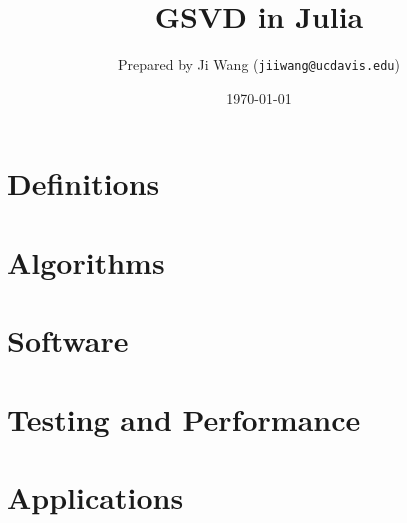 \documentclass{article}
\title{GSVD in Julia}
\author{
Prepared by Ji Wang ({\tt jiiwang@ucdavis.edu})
}
\date{\today}
\numberwithin{equation}{section}
\begin{document}
\maketitle

\tableofcontents

\newpage
\section{Definitions}

\newpage

\section{Algorithms}

\newpage

\section{Software}
    
\newpage

\section{Testing and Performance}

\newpage

\section{Applications}

\newpage


 

\end{document}
